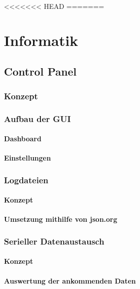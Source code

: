 <<<<<<< HEAD
=======

\chapter{Informatik}
\section{Control Panel}
\label{sec:controlpanel}

\subsection{Konzept}


\subsection{Aufbau der GUI}

\subsubsection{Dashboard}

\subsubsection{Einstellungen}

\subsection{Logdateien}

\subsubsection{Konzept}
\subsubsection{Umsetzung mithilfe von json.org}

\subsection{Serieller Datenaustausch}
\subsubsection{Konzept}
\subsubsection{Auswertung der ankommenden Daten}
